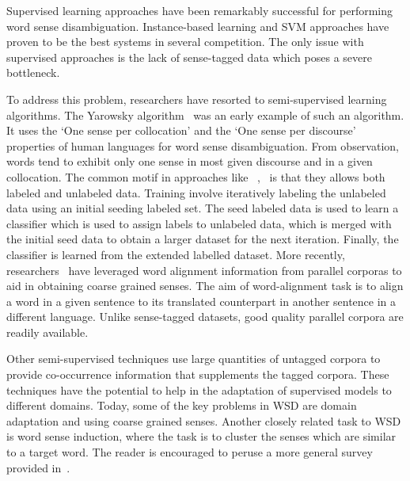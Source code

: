 \documentclass[12pt,letterpaper]{article}
\begin{document}
Supervised learning approaches have been remarkably successful for performing word sense disambiguation. Instance-based learning and SVM approaches have proven to be the best systems in several competition. The only issue with supervised approaches is the lack of sense-tagged data which poses a severe bottleneck. 

To address this problem, researchers have resorted to semi-supervised learning algorithms. The Yarowsky algorithm~\cite{yarowsky1995unsupervised} was an early example of such an algorithm. It uses the `One sense per collocation' and the `One sense per discourse' properties of human languages for word sense disambiguation. From observation, words tend to exhibit only one sense in most given discourse and in a given collocation. The common motif in approaches like ~\cite{yarowsky1995unsupervised},~\cite{le2008semi} is that they allows both labeled and unlabeled data. Training involve iteratively labeling the unlabeled data using an initial seeding labeled set. The seed labeled data is used to learn a classifier which is used to assign labels to unlabeled data, which is merged with the initial seed data to obtain a larger dataset for the next iteration. Finally, the classifier is learned from the extended labelled dataset.
More recently, researchers~\cite{Ng} have leveraged word alignment information from parallel corporas to aid in obtaining coarse grained senses. The aim of word-alignment task is to align a word in a given sentence to its translated counterpart in another sentence in a different language. Unlike sense-tagged datasets, good quality parallel corpora are readily available. 


Other semi-supervised techniques use large quantities of untagged corpora to provide co-occurrence information that supplements the tagged corpora. These techniques have the potential to help in the adaptation of supervised models to different domains. Today, some of the key problems in WSD are domain adaptation and using coarse grained senses. Another closely related task to WSD is word sense induction, where the task is to cluster the senses which are similar to a target word. The reader is encouraged to peruse a more general  survey provided in~\cite{navigli2009word}. 
\end{document}
